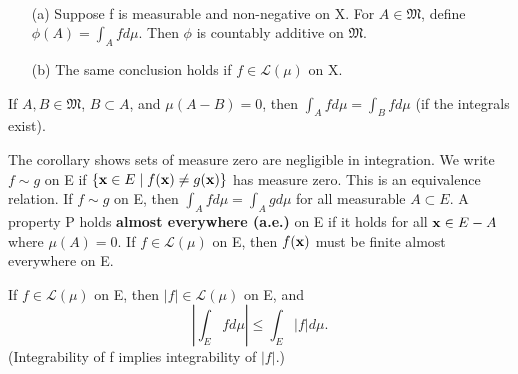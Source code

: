 \begin{theorem}
  \label{thm:chap11:integral_as_measure}
  ~ %
  \begin{itemize}
    \item[(a)] Suppose f is measurable and non-negative on X. For $A
      \in \mathfrak{M}$, define $\phi(A) = \int_A f d\mu$. Then
      $\phi$ is countably additive on $\mathfrak{M}$.
    \item[(b)] The same conclusion holds if $f \in \mathcal{L}(\mu)$ on X.
  \end{itemize}
\end{theorem}

\begin{corollary}
  \label{cor:chap11:integral_measure_zero_set}
  If $A, B \in \mathfrak{M}$, $B \subset A$, and $\mu(A - B) = 0$,
  then $\int_A f d\mu = \int_B f d\mu$ (if the integrals exist).
\end{corollary}

\begin{remark}
  \label{rem:chap11:almost_everywhere}
  The corollary shows sets of measure zero are negligible in
  integration. We write $f \sim g$ on E if $\{ \mathbf{x} \in E \mid
  f(\mathbf{x}) \ne g(\mathbf{x}) \}$ has measure zero. This is an
  equivalence relation. If $f \sim g$ on E, then $\int_A f d\mu =
  \int_A g d\mu$ for all measurable $A \subset E$.
  A property P holds \textbf{almost everywhere (a.e.)} on E if it
  holds for all $\mathbf{x} \in E - A$ where $\mu(A)=0$.
  If $f \in \mathcal{L}(\mu)$ on E, then $f(\mathbf{x})$ must be finite
  almost everywhere on E.
\end{remark}

\begin{theorem}
  \label{thm:chap11:integral_abs_value_ineq}
  If $f \in \mathcal{L}(\mu)$ on E, then $|f| \in \mathcal{L}(\mu)$ on E, and
  \[
    \left| \int_E f d\mu \right| \le \int_E |f| d\mu.
  \]
  (Integrability of f implies integrability of $|f|$.)
\end{theorem}



